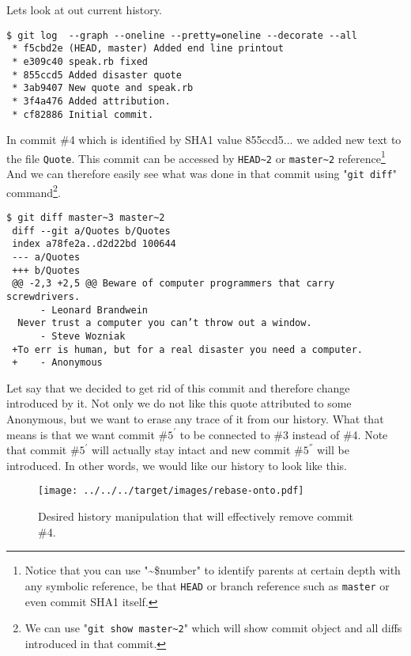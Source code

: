 \documentclass{article}
\theoremstyle{definition}
\begin{document}
        Lets look at out current history.
        \begin{Verbatim}[frame=single]
 $ git log  --graph --oneline --pretty=oneline --decorate --all
 * f5cbd2e (HEAD, master) Added end line printout
 * e309c40 speak.rb fixed
 * 855ccd5 Added disaster quote
 * 3ab9407 New quote and speak.rb
 * 3f4a476 Added attribution.
 * cf82886 Initial commit.
        \end{Verbatim}
        In commit \#4 which is identified by SHA1 value 855ccd5... we added new text to the file \texttt{Quote}. This
        commit can be accessed by \texttt{HEAD\textasciitilde2} or \texttt{master\textasciitilde2}
        reference\footnote{Notice that you can use "\textasciitilde\$number" to identify parents at certain depth with
          any symbolic reference, be that \texttt{HEAD} or branch reference such as \texttt{master} or even commit
          SHA1 itself.}
        And we can therefore easily see what was done in that commit using "\texttt{git diff}"
        command\footnote{We can use "\texttt{git show master\textasciitilde2}" which will show commit object and all
          diffs introduced in that commit.}.
        \newpage
        \begin{Verbatim}[frame=single]
 $ git diff master~3 master~2
 diff --git a/Quotes b/Quotes
 index a78fe2a..d2d22bd 100644
 --- a/Quotes
 +++ b/Quotes
 @@ -2,3 +2,5 @@ Beware of computer programmers that carry screwdrivers.
      - Leonard Brandwein
  Never trust a computer you can’t throw out a window.
      - Steve Wozniak
 +To err is human, but for a real disaster you need a computer.
 +    - Anonymous
        \end{Verbatim}
        Let say that we decided to get rid of this commit and therefore change introduced by it. Not only we do not
        like this quote attributed to some Anonymous, but we want to erase any trace of it from our history. What
        that means is that we want commit \#$5^{'}$ to be connected to \#3 instead of \#4. Note that
        commit \#$5^{'}$ will actually stay intact and new commit \#$5^{''}$ will be introduced. In other words, we
        would like our history to look like this.

        \begin{figure}[h]
        \centering\texttt{[image: ../../../target/images/rebase-onto.pdf]}
        \caption{Desired history manipulation that will effectively remove commit \#4. \label{fig:rebase-onto}}
        \end{figure}
\end{document}
